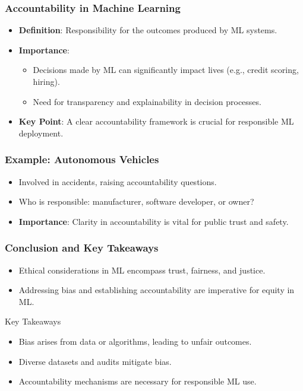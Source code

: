 \documentclass[aspectratio=169]{beamer}
\begin{document}
\begin{frame}[fragile]
    \frametitle{Accountability in Machine Learning}
    \begin{itemize}
        \item \textbf{Definition}: Responsibility for the outcomes produced by ML systems.
        \item \textbf{Importance}:
        \begin{itemize}
            \item Decisions made by ML can significantly impact lives (e.g., credit scoring, hiring).
            \item Need for transparency and explainability in decision processes.
        \end{itemize}
        \item \textbf{Key Point}: A clear accountability framework is crucial for responsible ML deployment.
    \end{itemize}
\end{frame}

\begin{frame}[fragile]
    \frametitle{Example: Autonomous Vehicles}
    \begin{itemize}
        \item Involved in accidents, raising accountability questions.
        \item Who is responsible: manufacturer, software developer, or owner?
        \item \textbf{Importance}: Clarity in accountability is vital for public trust and safety.
    \end{itemize}
\end{frame}

\begin{frame}[fragile]
    \frametitle{Conclusion and Key Takeaways}
    \begin{itemize}
        \item Ethical considerations in ML encompass trust, fairness, and justice.
        \item Addressing bias and establishing accountability are imperative for equity in ML.
    \end{itemize}
    \begin{block}{Key Takeaways}
        \begin{itemize}
            \item Bias arises from data or algorithms, leading to unfair outcomes.
            \item Diverse datasets and audits mitigate bias.
            \item Accountability mechanisms are necessary for responsible ML use.
        \end{itemize}
    \end{block}
\end{frame}
\end{document}
